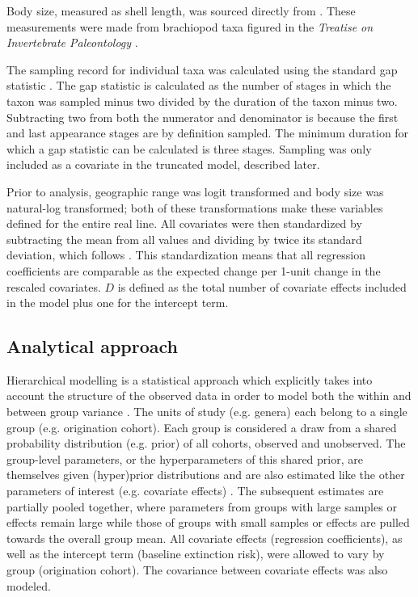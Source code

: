 \documentclass{article}
\begin{document}
Body size, measured as shell length, was sourced directly from \citet{Payne2014}. These measurements were made from brachiopod taxa figured in the \textit{Treatise on Invertebrate Paleontology} \citep{Brunton2007}.

The sampling record for individual taxa was calculated using the standard gap statistic \citep{Foote1996e,Foote2000}. The gap statistic is calculated as the number of stages in which the taxon was sampled minus two divided by the duration of the taxon minus two. Subtracting two from both the numerator and denominator is because the first and last appearance stages are by definition sampled. The minimum duration for which a gap statistic can be calculated is three stages. Sampling was only included as a covariate in the truncated model, described later.

Prior to analysis, geographic range was logit transformed and body size was natural-log transformed; both of these transformations make these variables defined for the entire real line. All covariates were then standardized by subtracting the mean from all values and dividing by twice its standard deviation, which follows \citet{Gelman2007}. This standardization means that all regression coefficients are comparable as the expected change per 1-unit change in the rescaled covariates. \(D\) is defined as the total number of covariate effects included in the model plus one for the intercept term.


\subsection{Analytical approach}

Hierarchical modelling is a statistical approach which explicitly takes into account the structure of the observed data in order to model both the within and between group variance \citep{Gelman2013d,Gelman2007}. The units of study (e.g. genera) each belong to a single group (e.g. origination cohort). Each group is considered a draw from a shared probability distribution (e.g. prior) of all cohorts, observed and unobserved. The group-level parameters, or the hyperparameters of this shared prior, are themselves given (hyper)prior distributions and are also estimated like the other parameters of interest (e.g. covariate effects) \citep{Gelman2013d}. The subsequent estimates are partially pooled together, where parameters from groups with large samples or effects remain large while those of groups with small samples or effects are pulled towards the overall group mean. All covariate effects (regression coefficients), as well as the intercept term (baseline extinction risk), were allowed to vary by group (origination cohort). The covariance between covariate effects was also modeled. 
\end{document}
